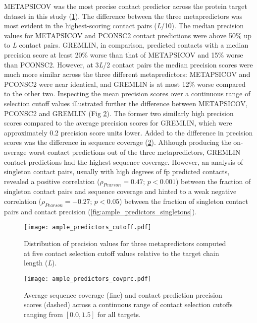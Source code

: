 METAPSICOV was the most precise contact predictor across the protein target dataset in this study (\cref{fig:ample_predictors_cutoff}). The difference between the three metapredictors was most evident in the highest-scoring contact pairs (\textit{L}/10). The median precision values for METAPSICOV and PCONSC2 contact predictions were above 50\% up to \textit{L} contact pairs. GREMLIN, in comparison, predicted contacts with a median precision score at least 20\% worse than that of METAPSICOV and 15\% worse than PCONSC2. However, at 3\textit{L}/2 contact pairs the median precision scores were much more similar across the three different metapredictors: METAPSICOV and PCONSC2 were near identical, and GREMLIN is at most 12\% worse compared to the other two. Inspecting the mean precision scores over a continuous range of selection cutoff values illustrated further the difference between METAPSICOV, PCONSC2 and GREMLIN (Fig \ref{fig:ample_predictors_covprc}). The former two similarly high precision scores compared to the average precision scores for GREMLIN, which were approximately 0.2 precision score units lower. Added to the difference in precision scores was the difference in sequence coverage (\cref{fig:ample_predictors_covprc}). Although producing the on-average worst contact predictions out of the three metapredictors, GREMLIN contact predictions had the highest sequence coverage. However, an analysis of singleton contact pairs, usually with high degrees of \gls{fp} predicted contacts, revealed a positive correlation ($\rho_{Pearson}=0.47$; $p<0.001$) between the fraction of singleton contact pairs and sequence coverage and hinted to a weak negative correlation ($\rho_{Pearson}=-0.27$; $p<0.05$) between the fraction of singleton contact pairs and contact precision (\cref{fig:ample_predictors_singletons}).

\begin{figure}[H]
    \centering
    \texttt{[image: ample\_predictors\_cutoff.pdf]}
    \caption[Precision analysis of three metapredictors]{Distribution of precision values for three metapredictors computed at five contact selection cutoff values relative to the target chain length (\textit{L}).}
    \label{fig:ample_predictors_cutoff}
\end{figure}

\begin{figure}[H]
    \centering
    \texttt{[image: ample\_predictors\_covprc.pdf]}
    \caption[Sequence coverage and contact precision analysis]{Average sequence coverage (line) and contact prediction precision scores (dashed) across a continuous range of contact selection cutoffs ranging from $[0.0, 1.5]$ for all targets.}
    \label{fig:ample_predictors_covprc}
\end{figure}

